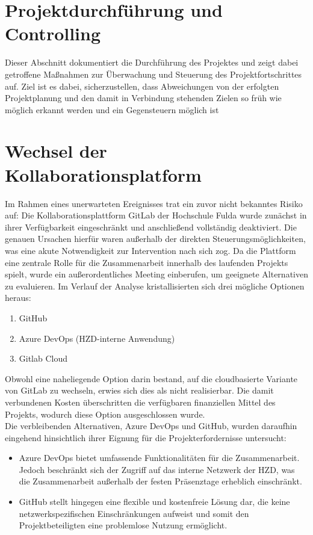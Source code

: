 \documentclass[12pt,oneside]{article}
\begin{document}
\section{Projektdurchführung und Controlling}
Dieser Abschnitt dokumentiert die Durchführung des Projektes und zeigt dabei getroffene Maßnahmen zur Überwachung und Steuerung des Projektfortschrittes auf.
Ziel ist es dabei, sicherzustellen, dass Abweichungen von der erfolgten Projektplanung und den damit in Verbindung stehenden Zielen so früh wie möglich erkannt 
werden und ein Gegensteuern möglich ist \cite[S.~55ff]{riedl_management_2019}

\section{Wechsel der Kollaborationsplatform}
Im Rahmen eines unerwarteten Ereignisses trat ein zuvor nicht bekanntes Risiko auf: Die Kollaborationsplattform GitLab der Hochschule Fulda wurde zunächst in ihrer Verfügbarkeit eingeschränkt und anschließend vollständig deaktiviert. Die genauen Ursachen hierfür waren außerhalb der direkten Steuerungsmöglichkeiten, was eine akute Notwendigkeit zur Intervention nach sich zog. 
Da die Plattform eine zentrale Rolle für die Zusammenarbeit innerhalb des laufenden Projekts spielt, wurde ein außerordentliches Meeting einberufen, um geeignete Alternativen zu evaluieren. Im Verlauf der Analyse kristallisierten sich drei mögliche Optionen heraus:

\begin{enumerate}
	\item GitHub
	\item Azure DevOps (HZD-interne Anwendung)
	\item Gitlab Cloud
\end{enumerate}

Obwohl eine naheliegende Option darin bestand, auf die cloudbasierte Variante von GitLab zu wechseln, erwies sich dies als nicht realisierbar. Die damit verbundenen Kosten überschritten die verfügbaren finanziellen Mittel des Projekts, wodurch diese Option ausgeschlossen wurde. \\

Die verbleibenden Alternativen, Azure DevOps und GitHub, wurden daraufhin eingehend hinsichtlich ihrer Eignung für die Projekterfordernisse untersucht:

\begin{itemize}
	\item Azure DevOps bietet umfassende Funktionalitäten für die Zusammenarbeit. Jedoch beschränkt sich der Zugriff auf das interne Netzwerk der HZD, was die Zusammenarbeit außerhalb der festen Präsenztage erheblich einschränkt.
	\item GitHub stellt hingegen eine flexible und kostenfreie Lösung dar, die keine netzwerkspezifischen Einschränkungen aufweist und somit den Projektbeteiligten eine problemlose Nutzung ermöglicht.
\end{itemize}
\end{document}
